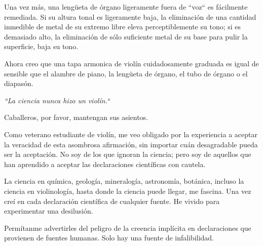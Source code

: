 \documentclass[12pt]{book}
\begin{document}
Una vez más, una lengüeta de órgano ligeramente fuera de ``voz`` es fácilmente remediada. Si su altura tonal es ligeramente baja, la eliminación de una cantidad inmedible de metal de su extremo libre eleva perceptiblemente su tono; si es demasiado alto, la eliminación de sólo suficiente metal de su base para pulir la superficie, baja su tono.

Ahora creo que una tapa armonica de violín cuidadosamente graduada es igual de sensible que el alambre de piano, la lengüeta de órgano, el tubo de órgano o el diapasón.

\textit{``La ciencia nunca hizo un violín.``}

Caballeros, por favor, mantengan sus asientos.

Como veterano estudiante de violín, me veo obligado por la experiencia a aceptar la veracidad de esta asombrosa afirmación, sin importar cuán desagradable pueda ser la aceptación. No soy de los que ignoran la ciencia; pero soy de aquellos que han aprendido a aceptar las declaraciones científicas con cautela.

La ciencia en química, geología, mineralogía, astronomía, botánica, incluso la ciencia en violinología, hasta donde la ciencia puede llegar, me fascina. Una vez creí en cada declaración científica de cualquier fuente. He vivido para experimentar una desilusión.

Permítanme advertirles del peligro de la creencia implícita en declaraciones que provienen de fuentes humanas. Solo hay una fuente de infalibilidad.
\end{document}
